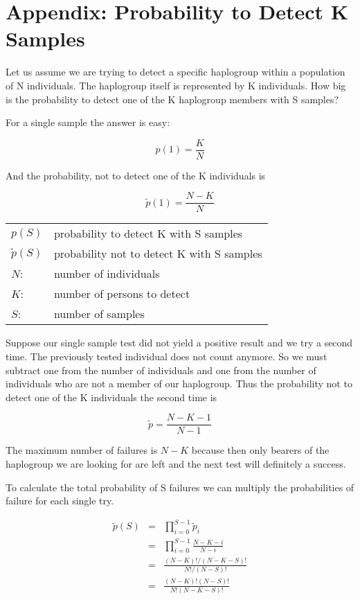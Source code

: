 \section{Appendix: Probability to Detect K Samples}

Let us assume we are trying to detect a specific haplogroup
within a population of N individuals. The haplogroup itself
is represented by K individuals. How big is the probability
to detect one of the K haplogroup members with S samples?

For a single sample the answer is easy:

\begin{equation}
p(1) = \frac{K}{N}
\end{equation}

And the probability, not to detect one of the K individuals
is

\begin{equation}
\tilde{p}(1) = \frac{N-K}{N}
\end{equation}

\begin{tabular}{ll}
$p(S)$         & probability to detect K with S samples\\
$\tilde{p}(S)$ & probability not to detect K with S samples\\
$N$: & number of individuals\\
$K$: & number of persons to detect\\
$S$: & number of samples
\end{tabular}
\vspace{1em}

Suppose our single sample test did not yield a positive result and
we try a second time. The previously tested individual
does not count anymore. So we must subtract one from the number
of individuals and one from the number of individuals who are 
not a member of our haplogroup. Thus the probability not to detect
one of the K individuals the second time is

\begin{equation}
\tilde{p} = \frac{N-K-1}{N-1}
\end{equation}

The maximum number of failures is $N-K$ because then only bearers
of the haplogroup we are looking for are left and the next test
will definitely a success.

To calculate the total probability of S failures we can multiply
the probabilities of failure for each single try.

\begin{eqnarray}
\tilde{p}(S) & = & \prod^{S-1}_{i=0} \tilde{p}_i\\
             & = & \prod^{S-1}_{i=0} \frac{N-K-i}{N-i}\\
             & = & \frac{(N-K)! / (N-K-S)!}{N! / (N-S)!}\\
             & = & \frac{(N-K)! (N-S)!}{N! (N-K-S)!}
\end{eqnarray}


